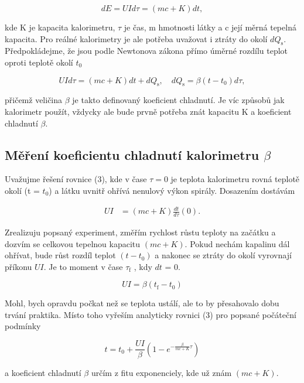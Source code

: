 \documentclass[a4paper,11pt]{article}
\begin{document}
\begin{equation}
    dE = UId\tau = (mc + K)dt,
\end{equation}

\noindent
kde K je kapacita kalorimetru, $\tau$ je čas, m hmotnosti látky a c její měrná tepelná kapacita. Pro reálné kalorimetry je ale potřeba uvažovat i ztráty do okolí $dQ_{\text{s}}$. Předpokládejme, že jsou podle Newtonova zákona přímo úměrné rozdílu teplot oproti teplotě okolí $t_0$

\begin{equation}
 UId\tau = (mc + K)dt + dQ_{\text{s}}, \quad dQ_{\text{s}} = \beta(t - t_0)d\tau,
\end{equation}

\noindent
přičemž veličina $\beta$ je takto definovaný koeficient chladnutí. Je víc způsobů jak kalorimetr použít, vždycky ale bude prvně potřeba znát kapacitu K a koeficient chladnutí $\beta$.

\subsection{Měření koeficientu chladnutí kalorimetru $\beta$}
Uvažujme řešení rovnice (3), kde v čase $\tau=0$ je teplota kalorimetru rovná teplotě okolí (t = $t_0$) a látku uvnitř ohřívá nenulový výkon spirály. Dosazením dostávám

\begin{align}
  UI &= (mc + K) \frac{dt}{d\tau}(0).
\end{align}

\noindent
Zrealizuju popsaný experiment, změřím rychlost růstu teploty na začátku a dozvím se celkovou tepelnou kapacitu $(mc + K)$. Pokud nechám kapalinu dál ohřívat, bude růst rozdíl teplot $(t - t_0)$ a nakonec se ztráty do okolí vyrovnají příkonu $UI$. Je to moment v čase $\tau_{\text{f}}$ , kdy $dt$ = 0.

\begin{equation}
UI = \beta (t_{\text{f}} - t_0)
\end{equation}

\noindent
Mohl, bych opravdu počkat než se teplota ustálí, ale to by přesahovalo dobu trvání praktika. Místo toho vyřeším analyticky rovnici (3) pro popsané počáteční podmínky

\begin{equation}
t = t_0 + \frac{UI}{\beta} \left(1 - e^{-\frac{\beta}{mc + K}\tau}\right)
\end{equation}

\noindent
a koeficient chladnutí $\beta$ určím z fitu exponenciely, kde už znám $(mc + K)$.
\end{document}
